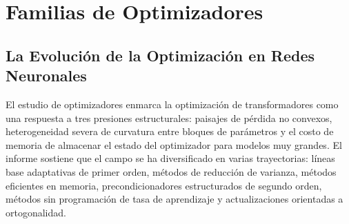 \section{Familias de Optimizadores}
\label{sec:annex-optimizers}

\subsection{La Evolución de la Optimización en Redes Neuronales}
El estudio de optimizadores enmarca la optimización de transformadores como una respuesta a tres presiones estructurales: paisajes de pérdida no convexos, heterogeneidad severa de curvatura entre bloques de parámetros y el costo de memoria de almacenar el estado del optimizador para modelos muy grandes. El informe sostiene que el campo se ha diversificado en varias trayectorias: líneas base adaptativas de primer orden, métodos de reducción de varianza, métodos eficientes en memoria, precondicionadores estructurados de segundo orden, métodos sin programación de tasa de aprendizaje y actualizaciones orientadas a ortogonalidad.








